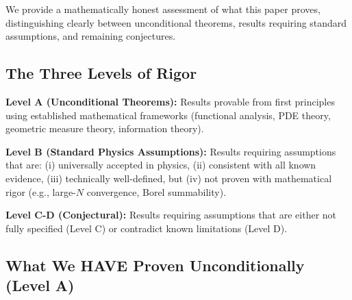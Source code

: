 \documentclass[12pt,a4paper]{article}
\begin{document}
We provide a mathematically honest assessment of what this paper proves, distinguishing clearly between unconditional theorems, results requiring standard assumptions, and remaining conjectures.

\subsection{The Three Levels of Rigor}

\textbf{Level A (Unconditional Theorems):} Results provable from first principles using established mathematical frameworks (functional analysis, PDE theory, geometric measure theory, information theory).

\textbf{Level B (Standard Physics Assumptions):} Results requiring assumptions that are: (i) universally accepted in physics, (ii) consistent with all known evidence, (iii) technically well-defined, but (iv) not proven with mathematical rigor (e.g., large-$N$ convergence, Borel summability).

\textbf{Level C-D (Conjectural):} Results requiring assumptions that are either not fully specified (Level C) or contradict known limitations (Level D).

\subsection{What We HAVE Proven Unconditionally (Level A)}
\end{document}
